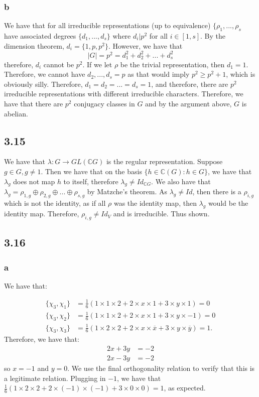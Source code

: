 \documentclass[]{article}
\begin{document}
\subsubsection*{b}
We have that for all irreducible representations (up to equivalence) $\lbrace \rho_1, ..., \rho_s$ have associated degrees $\lbrace d_1, ..., d_s \rbrace$ where $d_i | p^2$ for all $i \in [1, s]$. By the dimension theorem, $d_i = \lbrace 1, p , p^2 \rbrace$. However, we have that
\begin{equation}
	|G| = p^2 = d_1^2 + d_2^2 + ... + d_s^2 
\end{equation}
therefore, $d_i$ cannot be $p^2$. If we let $\rho$ be the trivial representation, then $d_1 = 1$. Therefore, we cannot have $d_2, ..., d_s = p$ as that would imply $p^2 \geq p^2 + 1$, which is obviously silly. Therefore, $d_1 = d_2 = ... = d_s = 1$, and therefore, there are $p^2$ irreducible representations with different irreducible characters. Therefore, we have that there are $p^2$ conjugacy classes in $G$ and by the argument above, $G$ is abelian.

\subsection*{3.15}
We have that $\lambda: G \rightarrow GL(\mathbb{C} G)$ is the regular representation. Suppose $g \in G, g \neq 1$. Then we have that on the basis $\lbrace h \in \mathbb{C}(G) : h \in G\rbrace$, we have that $\lambda_g$ does not map $h$ to itself, therefore $\lambda_g \neq Id_{\mathbb{C}G}$. We also have that $\lambda_g = \rho_{1, g} \oplus \rho_{2, g} \oplus ... \oplus \rho_{s, g}$ by Matzche's theorem. As $\lambda_g \neq Id$, then there is a $\rho_{i, g}$ which is not the identity, as if all $\rho$ was the identity map, then $\lambda_g$ would be the identity map. Therefore, $\rho_{i, g} \neq Id_V$ and is irreducible. Thus shown. 
\subsection*{3.16}
\subsubsection*{a}
We have that:

\begin{align*}
	\lbrace \chi_3 , \chi_1 \rbrace &= \frac{1}{6}( 1 \times 1 \times 2 + 2 \times x \times 1 + 3 \times y \times 1) = 0\\
	\lbrace \chi_3 , \chi_2 \rbrace &= \frac{1}{6}( 1 \times 1 \times 2 + 2 \times x \times 1 + 3 \times y \times -1) = 0\\
	\lbrace \chi_3 , \chi_3 \rbrace &= \frac{1}{6}( 1 \times 2 \times 2 + 2 \times x \times \overline{x} + 3 \times y \times \overline{y}) = 1.
\end{align*}
Therefore, we have that:
\begin{align*}
	2x + 3y &= -2\\
	2x - 3y &= -2
\end{align*}
so $x = -1$ and $y = 0$. We use the final orthogonality relation to verify that this is a legitimate relation. Plugging in $-1$, we have that $\frac{1}{6}( 1 \times 2 \times 2 + 2 \times (-1) \times (-1) + 3 \times 0 \times 0) = 1$, as expected.
\end{document}
